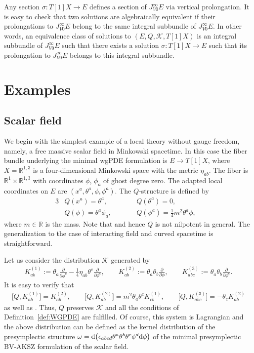 \documentclass[10pt,a4paper]{amsart}
\numberwithin{equation}{section}
\theoremstyle{definition}
\newcommand{\fR}{\mathbb{R}}
\def\cK{\mathcal{K}}
\begin{document}
Any section $\sigma\colon T[1]X\to E$ defines a section of $J^\infty_{V0}E$ via vertical prolongation. It is easy to check that two solutions are algebraically equivalent if their prolongations to $J^\infty_{V0} E$ belong to the same integral subbundle of $J^\infty_{V0} E$. In other words, an equivalence class of solutions to $(E,Q,\cK,T[1]X)$ is an integral subbundle of $J^\infty_{V0} E$ such that there exists a solution $\sigma\colon T[1]X \to E$ such that its prolongation to $J^\infty_{V0} E$ belongs to this integral subbundle.

\section{Examples} \label{sec:examples}

\subsection{Scalar field }
We begin with the simplest example of a local theory without gauge freedom, namely, a free massive scalar field in Minkowski spacetime. In this case the fiber bundle underlying the minimal wgPDE formulation is $E\rightarrow T[1]X$, where $X=\mathbb{R}^{1,3}$ is a four-dimensional Minkowski space with the metric $\eta_{ab}$. The fiber is $\fR^1 \times \fR^{1,3}$ with coordinates $\phi$, $\phi_a$ of ghost degree zero. The adapted local coordinates on $E$ are $(x^a,\theta^a,\phi,\phi^a)$. The $Q$-structure is defined by
\begin{alignat*}{3}
 &Q(x^a)=\theta^a, \qquad&& Q(\theta^a)=0,&\\
 &Q(\phi)=\theta^a\phi_a, \qquad&& Q(\phi^a)=\frac{1}{4}m^2\theta^a\phi,&
\end{alignat*}
where $m\in\mathbb{R}$ is the mass. Note that  and hence $Q$ is not nilpotent in general. The generalization to the case of interacting field and curved spacetime is straightforward.

Let us consider the distribution $\mathcal{K}$ generated by
\begin{gather}
 K^{(1)}_{ab}:=\theta_a\frac{\partial}{\partial \phi^b}-\frac{1}{4}\eta_{ab}\theta^c\frac{\partial}{\partial\phi^c},\qquad K^{(2)}_{ab}:=\theta_a\theta_b\frac{\partial}{\partial\phi},\qquad
 K^{(3)}_{abc}:=\theta_a\theta_b\frac{\partial}{\partial\phi^c}.\label{scald}
 \end{gather}
It is easy to verify that
\begin{gather*}
 \bigl[Q, K^{(1)}_{ab}\bigr]=K^{(2)}_{ab},\qquad
 \bigl[Q, K^{(2)}_{ab}\bigr]=m^2\theta_a\theta^cK^{(1)}_{cb},\qquad
 \bigl[Q, K^{(3)}_{abc}\bigr]=-\theta_cK^{(2)}_{ab}
\end{gather*}
as well as .
Thus, $Q$ preserves $\cK$ and all the conditions of Definition~\ref{def:WGPDE} are fulfilled. Of course, this system is Lagrangian and the above distribution can be defined as the kernel distribution of the presymplectic structure $\omega={\rm d}\bigl(\epsilon_{abcd}\theta^a\theta^b\theta^c \phi^d {\rm d}\phi\bigr)$ of the minimal presymplectic BV-AKSZ formulation of the scalar field.
\end{document}
